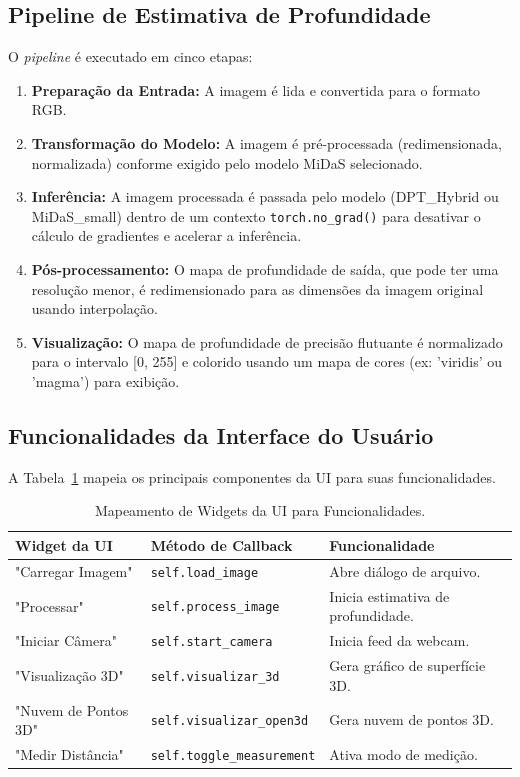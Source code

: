 \documentclass{SBCbookchapter}
\begin{document}
    \subsection{Pipeline de Estimativa de Profundidade}
    O \textit{pipeline} é executado em cinco etapas:
    \begin{enumerate}
        \item \textbf{Preparação da Entrada:} A imagem é lida e convertida para o formato RGB.
        \item \textbf{Transformação do Modelo:} A imagem é pré-processada (redimensionada, normalizada) conforme exigido pelo modelo MiDaS selecionado.
        \item \textbf{Inferência:} A imagem processada é passada pelo modelo (DPT\_Hybrid ou MiDaS\_small) dentro de um contexto \texttt{torch.no\_grad()} para desativar o cálculo de gradientes e acelerar a inferência.
        \item \textbf{Pós-processamento:} O mapa de profundidade de saída, que pode ter uma resolução menor, é redimensionado para as dimensões da imagem original usando interpolação.
        \item \textbf{Visualização:} O mapa de profundidade de precisão flutuante é normalizado para o intervalo [0, 255] e colorido usando um mapa de cores (ex: 'viridis' ou 'magma') para exibição.
    \end{enumerate}

    \subsection{Funcionalidades da Interface do Usuário}
    A Tabela~\ref{table:ui_features} mapeia os principais componentes da UI para suas funcionalidades.

    \begin{table}[h!]
        \centering
        \caption{Mapeamento de Widgets da UI para Funcionalidades.}
        \label{table:ui_features}
        \begin{tabular}{lll}
            \toprule \textbf{Widget da UI} & \textbf{Método de Callback}    & \textbf{Funcionalidade}         \\
            \midrule "Carregar Imagem"      & \texttt{self.load\_image}        & Abre diálogo de arquivo.        \\
            "Processar"            & \texttt{self.process\_image}     & Inicia estimativa de profundidade. \\
            "Iniciar Câmera"       & \texttt{self.start\_camera}      & Inicia feed da webcam.          \\
            "Visualização 3D"      & \texttt{self.visualizar\_3d}     & Gera gráfico de superfície 3D.  \\
            "Nuvem de Pontos 3D"   & \texttt{self.visualizar\_open3d} & Gera nuvem de pontos 3D.        \\
            "Medir Distância"      & \texttt{self.toggle\_measurement} & Ativa modo de medição.          \\
            \bottomrule
        \end{tabular}
    \end{table}
\end{document}
